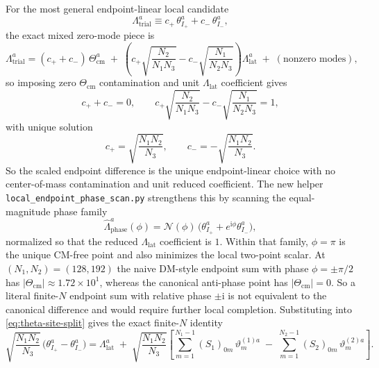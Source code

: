 \documentclass[11pt]{article}
\newcommand{\ii}{\mathrm{i}}
\begin{document}
For the most general endpoint-linear local candidate
\begin{equation}
\Lambda_{\mathrm{trial}}^a
\equiv
c_+\,\theta_{I_+}^a+c_-\,\theta_{I_-}^a,
\label{eq:theta-local-trial}
\end{equation}
the exact mixed zero-mode piece is
\begin{equation}
\Lambda_{\mathrm{trial}}^a
=
(c_+ + c_-)\,\Theta_{\mathrm{cm}}^a
\;+\;
\left(
c_+\sqrt{\frac{N_2}{N_1N_3}}
-c_-\sqrt{\frac{N_1}{N_2N_3}}
\right)\Lambda_{\mathrm{lat}}^a
\;+\;(\text{nonzero modes}),
\label{eq:theta-local-trial-mixed}
\end{equation}
so imposing zero $\Theta_{\mathrm{cm}}$ contamination and unit
$\Lambda_{\mathrm{lat}}$ coefficient gives
\begin{equation}
c_+ + c_- = 0,
\qquad
c_+\sqrt{\frac{N_2}{N_1N_3}}
-c_-\sqrt{\frac{N_1}{N_2N_3}}
=1,
\label{eq:theta-local-trial-constraints}
\end{equation}
with unique solution
\begin{equation}
c_+=\sqrt{\frac{N_1N_2}{N_3}},
\qquad
c_-=-\sqrt{\frac{N_1N_2}{N_3}}.
\label{eq:theta-local-trial-solution}
\end{equation}
So the scaled endpoint difference is the unique endpoint-linear choice with no
center-of-mass contamination and unit reduced coefficient.
The new helper \texttt{local\_endpoint\_phase\_scan.py} strengthens this by
scanning the equal-magnitude phase family
\[
\widehat\Lambda_{\mathrm{phase}}^a(\phi)
=
\mathcal N(\phi)\,
\bigl(\theta_{I_+}^a+e^{\ii\phi}\theta_{I_-}^a\bigr),
\]
normalized so that the reduced $\Lambda_{\mathrm{lat}}$ coefficient is $1$.
Within that family, $\phi=\pi$ is the unique CM-free point and also minimizes
the local two-point scalar. At $(N_1,N_2)=(128,192)$ the naive DM-style
endpoint sum with phase $\phi=\pm\pi/2$ has
$|\Theta_{\mathrm{cm}}|\approx 1.72\times 10^1$, whereas the canonical
anti-phase point has $|\Theta_{\mathrm{cm}}|=0$. So a literal finite-$N$
endpoint sum with relative phase $\pm\ii$ is not equivalent to the canonical
difference and would require further local completion.
Substituting into \eqref{eq:theta-site-split} gives the exact finite-$N$ identity
\begin{equation}
\sqrt{\frac{N_1N_2}{N_3}}\,
\bigl(\theta_{I_+}^a-\theta_{I_-}^a\bigr)
=
\Lambda_{\mathrm{lat}}^a
\;+\;
\sqrt{\frac{N_1N_2}{N_3}}
\left[
\sum_{m=1}^{N_1-1}(S_1)_{0m}\,\vartheta_m^{(1)a}
\;-\;
\sum_{m=1}^{N_2-1}(S_2)_{0m}\,\vartheta_m^{(2)a}
\right].
\label{eq:theta-local-bridge}
\end{equation}
\end{document}
